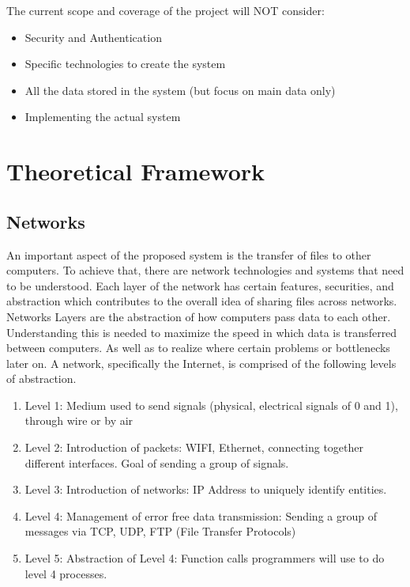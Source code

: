 \documentclass[acmsmall]{acmart}
\begin{document}
The current scope and coverage of the project will NOT consider:

\begin{itemize}
    \item Security and Authentication 
    \item Specific technologies to create the system
    \item All the data stored in the system (but focus on main data only)
    \item Implementing the actual system
\end{itemize}




\section{Theoretical Framework}

\subsection{Networks}

An important aspect of the proposed system is the transfer of files to other computers. To achieve that, there are network technologies and systems that need to be understood. Each layer of the network has certain features, securities, and abstraction which contributes to the overall idea of sharing files across networks. Networks Layers are the abstraction of how computers pass data to each other. Understanding this is needed to maximize the speed in which data is transferred between computers. As well as to realize where certain problems or bottlenecks later on. A network, specifically the Internet, is comprised of the following levels of abstraction. \cite{kurose}
\begin{enumerate}
    \item Level 1: Medium used to send signals (physical, electrical signals of 0
and 1), through wire or by air
    \item Level 2: Introduction of packets: WIFI, Ethernet, connecting together
different interfaces. Goal of sending a group of signals.
    \item Level 3: Introduction of networks: IP Address to uniquely identify
entities.
    \item Level 4: Management of error free data transmission: Sending a group
of messages via TCP, UDP, FTP (File Transfer Protocols)
    \item Level 5: Abstraction of Level 4: Function calls programmers will use
to do level 4 processes.
\end{enumerate}
\end{document}
